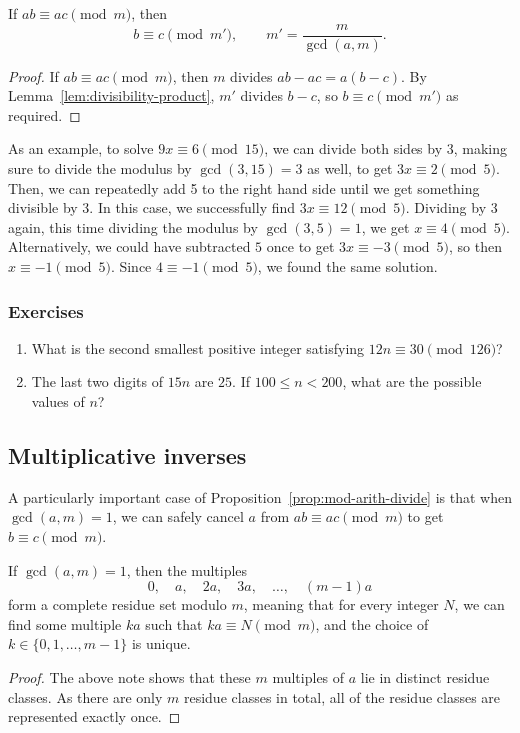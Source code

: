\begin{proposition}\label{prop:mod-arith-divide}
If $ab\equiv ac\pmod{m}$, then
\begin{equation*}
b\equiv c\pmod{m'},\qquad m' = \frac{m}{\gcd(a,m)}.
\end{equation*}
\end{proposition}
\begin{proof}
If $ab\equiv ac\pmod{m}$, then $m$ divides $ab - ac = a(b - c)$. By Lemma~\ref{lem:divisibility-product}, $m'$ divides $b - c$, so $b\equiv c\pmod{m'}$ as required.
\end{proof}

As an example, to solve $9x\equiv 6\pmod{15}$, we can divide both sides by $3$, making sure to divide the modulus by $\gcd(3,15) = 3$ as well, to get $3x\equiv 2\pmod{5}$. Then, we can repeatedly add 5 to the right hand side until we get something divisible by 3. In this case, we successfully find $3x\equiv 12\pmod{5}$. Dividing by 3 again, this time dividing the modulus by $\gcd(3,5) = 1$, we get $x\equiv 4\pmod{5}$. Alternatively, we could have subtracted $5$ once to get $3x\equiv -3\pmod{5}$, so then $x\equiv -1\pmod{5}$. Since $4\equiv -1\pmod{5}$, we found the same solution.

\subsubsection*{Exercises}

\begin{enumerate}
\item What is the second smallest positive integer satisfying $12n\equiv 30\pmod{126}$?
\item The last two digits of $15n$ are $25$. If $100\leq n < 200$, what are the possible values of $n$?
\end{enumerate}


\subsection{Multiplicative inverses}

A particularly important case of Proposition~\ref{prop:mod-arith-divide} is that when $\gcd(a,m) = 1$, we can safely cancel $a$ from $ab\equiv ac\pmod{m}$ to get $b\equiv c\pmod{m}$.

\begin{theorem}\label{thm:complete-residue-set}
If $\gcd(a,m) = 1$, then the multiples
\begin{equation*}
0,\quad a,\quad 2a,\quad 3a,\quad \ldots,\quad (m - 1)a
\end{equation*}
form a complete residue set modulo $m$, meaning that for every integer $N$, we can find some multiple $ka$ such that $ka\equiv N\pmod{m}$, and the choice of $k\in\{0, 1, \ldots, m - 1\}$ is unique.
\end{theorem}
\begin{proof}
The above note shows that these $m$ multiples of $a$ lie in distinct residue classes. As there are only $m$ residue classes in total, all of the residue classes are represented exactly once.
\end{proof}

